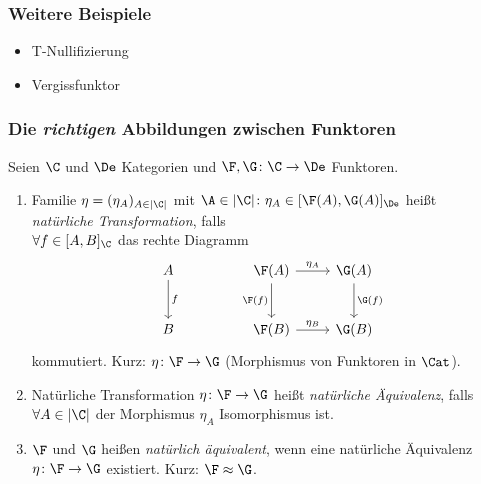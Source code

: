 \begin{frame}[fragile]
  \frametitle{Weitere Beispiele}
  \begin{itemize}
    \item T-Nullifizierung
    \item Vergissfunktor
  \end{itemize}
\end{frame}

\begin{frame}[fragile]
  \frametitle{Die \emph{richtigen} Abbildungen zwischen Funktoren}
  Seien $\C$ und $\De$ Kategorien und $\F, \G \colon \C \to \De$ Funktoren.
  \begin{enumerate}[1)]
    \item<+-> Familie $\eta = (\eta_A)_{A \in |\C|}$ mit $\A \in |\C| \colon \eta_A \in [\F(A), \G(A)]_\De$ heißt 
      \\\emph{natürliche Transformation}, falls \\ $\forall f \in [A,B]_\C$ das rechte Diagramm
      $$
      \begin{tikzcd}[row sep=2.5em]
        A\arrow[d,"f"] & & \F(A)\arrow[r,"\eta_A"]\arrow[d,"\F(f)"'] & \G(A)\arrow[d,"\G(f)"] \\
        B & & \F(B)\arrow[r,"\eta_B"] & \G(B)
      \end{tikzcd}
      $$
      kommutiert. Kurz: $\eta \colon \F \to \G$ (Morphismus von Funktoren in $\Cat$).
    \item<+->Natürliche Transformation $\eta \colon \F \to \G$ heißt \emph{natürliche Äquivalenz}, falls $\forall A \in |\C|$ der Morphismus $\eta_A$ Isomorphismus ist.
    \item<+-> $\F$ und $\G$ heißen \emph{natürlich äquivalent},  wenn eine natürliche Äquivalenz $\eta \colon \F \to \G$ existiert. Kurz: $\F \approx \G$.
  \end{enumerate}
\end{frame}

